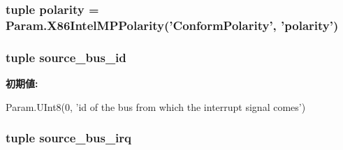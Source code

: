 \label{classIntelMP_1_1X86IntelMPIOIntAssignment_a47ced18ebb7927f6eede388751a1e331}
\hypertarget{classIntelMP_1_1X86IntelMPIOIntAssignment_aa4bc0ac88ce7c17dc39f4f675e09fc65}{
\subsubsection[{polarity}]{\setlength{\rightskip}{0pt plus 5cm}tuple {\bf polarity} = Param.X86IntelMPPolarity('ConformPolarity', '{\bf polarity}')}}
\label{classIntelMP_1_1X86IntelMPIOIntAssignment_aa4bc0ac88ce7c17dc39f4f675e09fc65}
\hypertarget{classIntelMP_1_1X86IntelMPIOIntAssignment_a6c1f8d95836f7b93621c1a4b51e63fe1}{
\subsubsection[{source\_\-bus\_\-id}]{\setlength{\rightskip}{0pt plus 5cm}tuple {\bf source\_\-bus\_\-id}}}
\label{classIntelMP_1_1X86IntelMPIOIntAssignment_a6c1f8d95836f7b93621c1a4b51e63fe1}
{\bfseries 初期値:}
\begin{DoxyCode}
Param.UInt8(0,
            'id of the bus from which the interrupt signal comes')
\end{DoxyCode}
\hypertarget{classIntelMP_1_1X86IntelMPIOIntAssignment_a42c96669425e02ec03b03caa9826d932}{
\subsubsection[{source\_\-bus\_\-irq}]{\setlength{\rightskip}{0pt plus 5cm}tuple {\bf source\_\-bus\_\-irq}}}
\label{classIntelMP_1_1X86IntelMPIOIntAssignment_a42c96669425e02ec03b03caa9826d932}
